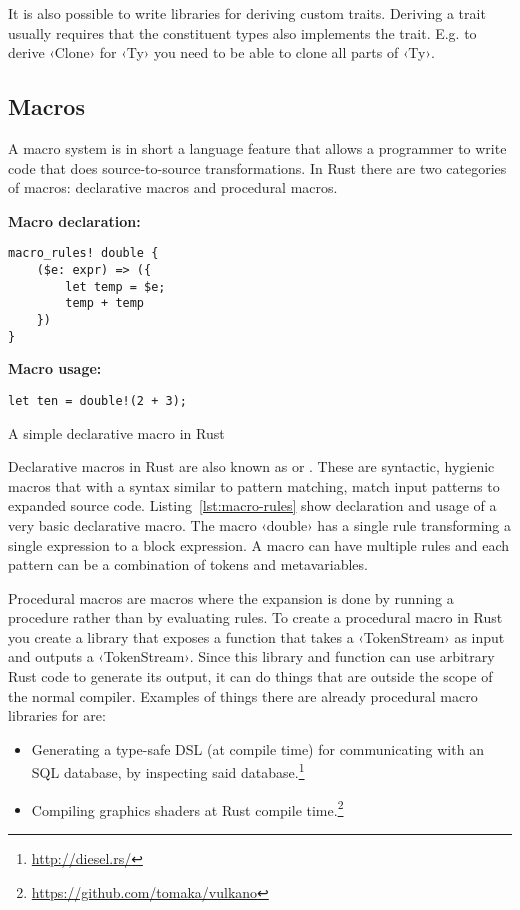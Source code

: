 It is also possible to write libraries for deriving custom traits. Deriving a trait usually requires that the constituent types also implements the trait. E.g. to derive ‹Clone› for ‹Ty› you need to be able to clone all parts of ‹Ty›.

\subsection{Macros}
\label{sec:macros}

A macro system is in short a language feature that allows a programmer to write code that does source-to-source transformations. In Rust there are two categories of macros: declarative macros and procedural macros.

\begin{listing}[ht!]
\textbf{Macro declaration:}
\begin{verbatim}
macro_rules! double {
    ($e: expr) => ({
        let temp = $e;
        temp + temp
    })
}
\end{verbatim}
\vspace{5mm}

\textbf{Macro usage:}
\begin{verbatim}
let ten = double!(2 + 3);
\end{verbatim}
\caption{A simple declarative macro in Rust}
\label{lst:macro-rules}
\end{listing}

Declarative macros in Rust are also known as  or . These are syntactic, hygienic macros that with a syntax similar to pattern matching, match input patterns to expanded source code. Listing~\ref{lst:macro-rules} show declaration and usage of a very basic declarative macro. The macro ‹double› has a single rule transforming a single expression to a block expression. A macro can have multiple rules and each pattern can be a combination of tokens and metavariables.

Procedural macros are macros where the expansion is done by running a procedure rather than by evaluating rules. To create a procedural macro in Rust you create a library that exposes a function that takes a ‹TokenStream› as input and outputs a ‹TokenStream›. Since this library and function can use arbitrary Rust code to generate its output, it can do things that are outside the scope of the normal compiler. Examples of things there are already procedural macro libraries for are:

\begin{itemize}
  \item Generating a type-safe DSL (at compile time) for communicating with an SQL database, by inspecting said database.\footnote{\url{http://diesel.rs/}}
  \item Compiling graphics shaders at Rust compile time.\footnote{\url{https://github.com/tomaka/vulkano}}
\end{itemize}

